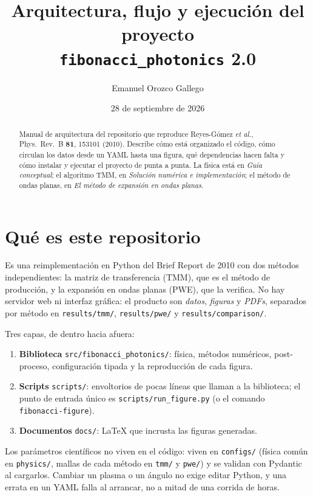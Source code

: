 \documentclass[11pt,a4paper]{article}
\title{Arquitectura, flujo y ejecución del proyecto\\
\texttt{fibonacci\_photonics} 2.0}
\author{Emanuel Orozco Gallego}
\date{28 de septiembre de 2026}
\begin{document}
\maketitle

\begin{abstract}
Manual de arquitectura del repositorio que reproduce
Reyes-Gómez \textit{et al.}, Phys.\ Rev.\ B \textbf{81}, 153101 (2010).
Describe cómo está organizado el código, cómo circulan los datos desde un
YAML hasta una figura, qué dependencias hacen falta y cómo instalar y
ejecutar el proyecto de punta a punta.
La física está en \textit{Guía conceptual}; el algoritmo TMM, en
\textit{Solución numérica e implementación}; el método de ondas planas, en
\textit{El método de expansión en ondas planas}.
\end{abstract}

\tableofcontents
\newpage

\section{Qué es este repositorio}

Es una reimplementación en Python del Brief Report de 2010 con dos métodos
independientes: la matriz de transferencia (TMM), que es el método de
producción, y la expansión en ondas planas (PWE), que la verifica. No hay
servidor web ni interfaz gráfica: el producto son \emph{datos}, \emph{figuras}
y \emph{PDFs}, separados por método en \texttt{results/tmm/},
\texttt{results/pwe/} y \texttt{results/comparison/}.

Tres capas, de dentro hacia afuera:

\begin{enumerate}
\item \textbf{Biblioteca} \texttt{src/fibonacci\_photonics/}: física, métodos
numéricos, post-proceso, configuración tipada y la reproducción de cada figura.
\item \textbf{Scripts} \texttt{scripts/}: envoltorios de pocas líneas que
llaman a la biblioteca; el punto de entrada único es
\texttt{scripts/run\_figure.py} (o el comando \texttt{fibonacci-figure}).
\item \textbf{Documentos} \texttt{docs/}: LaTeX que incrusta las figuras
generadas.
\end{enumerate}

Los parámetros científicos no viven en el código: viven en
\texttt{configs/} (física común en \texttt{physics/}, mallas de cada método
en \texttt{tmm/} y \texttt{pwe/}) y se validan con Pydantic al cargarlos.
Cambiar un plasma o un ángulo no exige editar Python, y una errata en un YAML
falla al arrancar, no a mitad de una corrida de horas.
\end{document}
